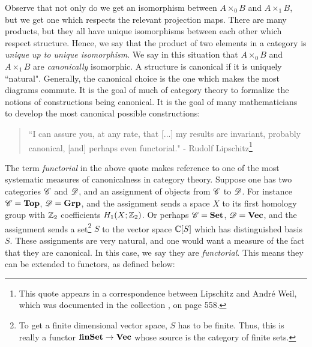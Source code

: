 \documentclass{article}
\theoremstyle{definition}
\numberwithin{figure}{section}
\begin{document}
Observe that not only do we get an isomorphism between $A\times_0 B$ and $A\times _1 B$, but we get one which respects the relevant projection maps. There are many products, but they all have unique isomorphisms between each other which respect structure. Hence, we say that the product of two elements in a category is \textit{unique up to unique isomorphism}. We say in this situation that $A\times_0 B$ and $A\times_1 B$ are \textit{canonically} isomorphic. A structure is canonical if it is uniquely ``natural". Generally, the canonical choice is the one which makes the most diagrams commute. It is the goal of much of category theory to formalize the notions of constructions being canonical. It is the goal of many mathematicians to develop the most canonical possible constructions:

\begin{quote}
``I can assure you, at any rate, that [...] my results are invariant, probably canonical, [and] perhaps even functorial." - Rudolf Lipschitz\footnote{This quote appears in a correspondence between Lipschitz and André Weil, which was documented in the collection \cite{weil2009oeuvres}, on page 558.}
\end{quote}

The term \textit{functorial} in the above quote makes reference to one of the most systematic measures of canonicalness in category theory. Suppose one has two categories $\mathscr{C}$ and $\mathscr{D}$, and an assignment of objects from $\mathscr{C}$ to $\mathscr{D}$. For instance $\mathscr{C}=\bold{Top}$, $\mathscr{D}=\bold{Grp}$, and the assignment sends a space $X$ to its first homology group with $\mathbb{Z}_2$ coefficients $H_1(X;\mathbb{Z}_2)$. Or perhaps $\mathscr{C}=\bold{Set}$, $\mathscr{D}=\bold{Vec}$, and the assignment sends a set\footnote{To get a finite dimensional vector space, $S$ has to be finite. Thus, this is really a functor $\bold{finSet}\to \bold{Vec}$ whose source is the category of finite sets.} $S$ to the vector space $\mathbb{C}[S]$ which has distinguished basis $S$. These assignments are very natural, and one would want a measure of the fact that they are canonical. In this case, we say they are \textit{functorial}. This means they can be extended to functors, as defined below:
\end{document}
